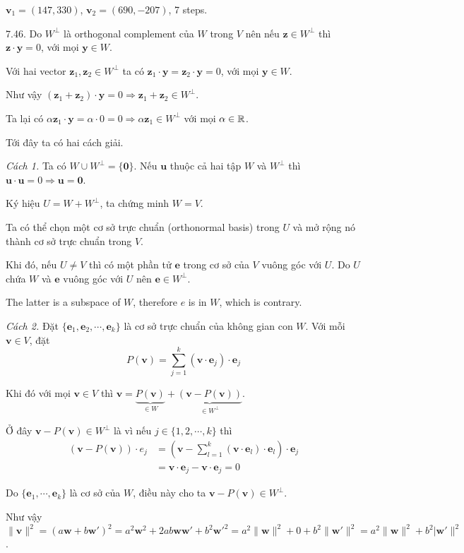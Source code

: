 $\bm{v}_1 = (147, 330)$, $\bm{v}_2 = (690, -207)$, 7 steps.

7.46. Do $W^\perp$ là orthogonal complement của $W$ trong $V$ nên nếu $\bm{z} \in W^\perp$ thì $\bm{z} \cdot \bm{y} = 0$, với mọi $\bm{y} \in W$.

Với hai vector $\bm{z}_1, \bm{z}_2 \in W^\perp$ ta có $\bm{z}_1 \cdot \bm{y} = \bm{z}_2 \cdot \bm{y} = 0$, với mọi $\bm{y} \in W$.

Như vậy $(\bm{z}_1 + \bm{z}_2) \cdot \bm{y} = 0 \Rightarrow \bm{z}_1 + \bm{z}_2 \in W^\perp$.

Ta lại có $\alpha \bm{z}_1 \cdot \bm{y} = \alpha \cdot 0 = 0 \Rightarrow \alpha\bm{z}_1 \in W^\perp$ với mọi $\alpha \in \mathbb{R}$.

Tới đây ta có hai cách giải.

\textit{Cách 1.} Ta có $W \cup W^\perp = \{\bm{0}\}$. Nếu $\bm{u}$ thuộc cả hai tập $W$ và $W^\perp$ thì $\bm{u} \cdot \bm{u} = 0 \Rightarrow \bm{u} = \bm{0}$.

Ký hiệu $U = W + W^\perp$, ta chứng minh $W = V$.

Ta có thể chọn một cơ sở trực chuẩn (orthonormal basis) trong $U$ và mở rộng nó thành cơ sở trực chuẩn trong $V$. 

Khi đó, nếu $U \neq V$ thì có một phần tử $\bm{e}$ trong cơ sở của $V$ vuông góc với $U$. Do $U$ chứa $W$ và $\bm{e}$ vuông góc với $U$ nên $\bm{e} \in W^\perp$. 

The latter is a subspace of $W$, therefore $e$ is in $W$, which is contrary.

\textit{Cách 2.} Đặt $\{ \bm{e}_1, \bm{e}_2, \cdots, \bm{e}_k \}$ là cơ sở trực chuẩn của không gian con $W$. Với mỗi $\bm{v} \in V$, đặt \[ P(\bm{v}) = \sum_{j=1}^{k} (\bm{v} \cdot \bm{e}_j)  \cdot \bm{e}_j \]

Khi đó với mọi $\bm{v} \in V$ thì $\bm{v} = \underbrace{P(\bm{v})}_{\in W} + \underbrace{(\bm{v} - P(\bm{v}))}_{\in W^\perp}$.

Ở đây $\bm{v} - P(\bm{v}) \in W^\perp$ là vì nếu $j \in \{ 1, 2, \cdots, k \}$ thì 
\begin{align*}
	(\bm{v} - P(\bm{v})) \cdot e_j & = \left(\bm{v} - \sum_{l=1}^{k} (\bm{v} \cdot \bm{e}_l) \cdot \bm{e}_l \right) \cdot \bm{e}_j \\
		& = \bm{v} \cdot \bm{e}_j - \bm{v} \cdot \bm{e}_j = 0	
\end{align*}

Do $\{ \bm{e}_1, \cdots, \bm{e}_k \}$ là cơ sở của $W$, điều này cho ta $\bm{v} - P(\bm{v}) \in W^\perp$.

Như vậy $\lVert \bm{v} \rVert^2 = (a \bm{w} + b \bm{w}')^2 = a^2 \bm{w}^2 + 2ab \bm{w} \bm{w}' + b^2 \bm{w}'^2 = a^2 \lVert \bm{w} \rVert^2 + 0 + b^2 \lVert \bm{w}' \rVert^2 = a^2 \lVert \bm{w} \rVert^2 + b^2 \lvert \bm{w}' \rVert^2$.

